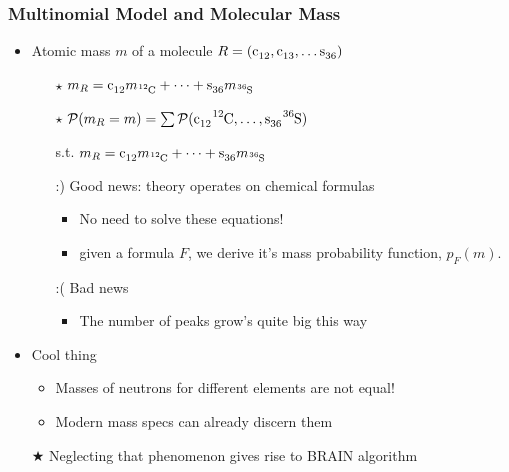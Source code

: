 \documentclass[xetex]{beamer}
\begin{document}
	\begin{frame}\frametitle{Multinomial Model and Molecular Mass}
		
		\begin{itemize}
			\item Atomic mass $m$ of a molecule $R = (\cem{c_{12}}, \cem{c_{13}}, \dots \cem{s_{36}})$ 
			\begin{itemize}
				\item[$\star$] $m_R = \cem{c_{12}} m_\cem{^{12}C} + \dots + \cem{s_{36}} m_\cem{^{36}S}$

				\item[$\star$] $\prob(m_R = m) = 
					\sum \prob(
						\cem{c_{12}} \cem{^{12}C}, 
						\dots, 
						\cem{s_{36}} \cem{^{36}S} )$
				\item[s.t.] $m_R = \cem{c_{12}} m_\cem{^{12}C} + \dots + \cem{s_{36}} m_\cem{^{36}S}$
				\item[:)] Good news: theory operates on chemical formulas
				\begin{itemize}
					\item No need to solve these equations!
					\item given a formula $F$, we derive it's mass probability function, $p_F (m)$.	
				\end{itemize}				 
				\item[:(] Bad news 
				\begin{itemize}
					\item The number of peaks grow's quite big this way
				\end{itemize}
			\end{itemize}
			\item Cool thing
			\begin{itemize}
				\item Masses of neutrons for different elements are not equal!
				\item Modern mass specs can already discern them
			\end{itemize}
			\item[$\bigstar$] Neglecting that phenomenon gives rise to BRAIN algorithm
		\end{itemize}



	\end{frame}
\end{document}

